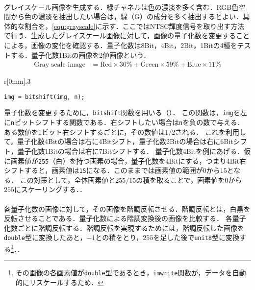 \paragraph{\kadaiab}
グレイスケール画像を生成する．緑チャネルは色の濃淡を多く含む．RGB色空間から色の濃淡を抽出したい場合は，緑（G）の成分を多く抽出するとよい．具体的な割合を，\eqref{equ:grayscale}に示す．ここではNTSC輝度信号を取り出す方法で行う．生成したグレイスケール画像に対して，画像の量子化数を変更することによる，画像の変化を確認する．量子化数は8Bit，4Bit，2Bit，1Bitの4種をテストする．量子化数1Bitの画像を2値画像という．
\begin{align}
    \textrm{Gray scale image} & = \textrm{Red}\times 30\% +\textrm{Green}\times 59\% +\textrm{Blue}\times 11\%\label{equ:grayscale}
\end{align}
\begin{wrapfigure}{r}[0mm]{.3\textwidth}
    \centering
    \vspace{-.7cm}
    \begin{lstlisting}[caption={\texttt{bitshift}関数},label={src:bitshift}]
img = bitshift(img, n);
    \end{lstlisting}
    \vspace{-.5cm}
\end{wrapfigure}
量子化数を変更するために，\texttt{bitshift}関数を用いる（）．
この関数は，\texttt{img}を左に\texttt{n}ビットシフトする関数である．右シフトしたい場合は\texttt{n}を負の数で与える．
ある数値を1ビット右シフトするごとに，その数値は\(1/2\)される．
これを利用して，量子化数4Bitの場合は右に4Bitシフト，量子化数2Bitの場合は右に6Bitシフト，量子化数1Bitの場合は右に7Bitシフトする．
量子化数4Bitを例にあげる．仮に画素値が\texttt{255}（白）を持つ画素の場合，量子化数を4Bitにする，つまり4Bit右シフトすると，画素値は\texttt{15}になる．このままでは画素値の範囲が\(0\)から\(15\)となる．
この対策として，全体画素値と\(255/15\)の積を取ることで，画素値を\(0\)から\(255\)にスケーリングする．\scall{\kadaiab}．
\paragraph{\kadaiac}
各量子化数の画像に対して，その画像を階調反転させる．階調反転とは，白黒を反転させることである．量子化数による階調変換後の画像を比較する．
各量子化数ごとに階調反転する．階調反転を実現するためには，階調反転した画像を\texttt{double}型に変換したあと，\(-1\)との積をとり，\(255\)を足した後で\texttt{unit8}型に変換する\footnote{その画像の各画素値が\texttt{double}型であるとき，\texttt{imwrite}関数が，データを自動的にリスケールするため．}．\scall{\kadaiac}．

